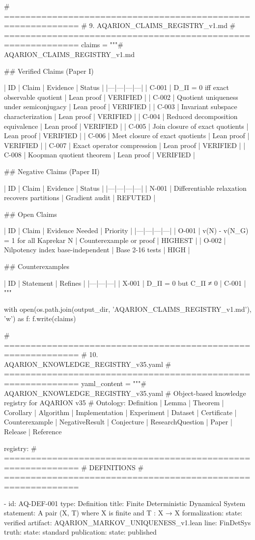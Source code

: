 # ============================================================
# 9. AQARION_CLAIMS_REGISTRY_v1.md
# ============================================================
claims = """# AQARION_CLAIMS_REGISTRY_v1.md

## Verified Claims (Paper I)

| ID | Claim | Evidence | Status |
|---|---|---|---|
| C-001 | D_Π = 0 iff exact observable quotient | Lean proof | VERIFIED |
| C-002 | Quotient uniqueness under semiconjugacy | Lean proof | VERIFIED |
| C-003 | Invariant subspace characterization | Lean proof | VERIFIED |
| C-004 | Reduced decomposition equivalence | Lean proof | VERIFIED |
| C-005 | Join closure of exact quotients | Lean proof | VERIFIED |
| C-006 | Meet closure of exact quotients | Lean proof | VERIFIED |
| C-007 | Exact operator compression | Lean proof | VERIFIED |
| C-008 | Koopman quotient theorem | Lean proof | VERIFIED |

## Negative Claims (Paper II)

| ID | Claim | Evidence | Status |
|---|---|---|---|
| N-001 | Differentiable relaxation recovers partitions | Gradient audit | REFUTED |

## Open Claims

| ID | Claim | Evidence Needed | Priority |
|---|---|---|---|
| O-001 | v(N) - v(N_G) = 1 for all Kaprekar N | Counterexample or proof | HIGHEST |
| O-002 | Nilpotency index base-independent | Base 2-16 tests | HIGH |

## Counterexamples

| ID | Statement | Refines |
|---|---|---|
| X-001 | D_Π = 0 but C_Π ≠ 0 | C-001 |
"""

with open(os.path.join(output_dir, 'AQARION_CLAIMS_REGISTRY_v1.md'), 'w') as f:
    f.write(claims)

# ============================================================
# 10. AQARION_KNOWLEDGE_REGISTRY_v35.yaml
# ============================================================
yaml_content = """# AQARION_KNOWLEDGE_REGISTRY_v35.yaml
# Object-based knowledge registry for AQARION v35
# Ontology: Definition | Lemma | Theorem | Corollary | Algorithm | Implementation | Experiment | Dataset | Certificate | Counterexample | NegativeResult | Conjecture | ResearchQuestion | Paper | Release | Reference

registry:
  # ============================================================
  # DEFINITIONS
  # ============================================================

  - id: AQ-DEF-001
    type: Definition
    title: Finite Deterministic Dynamical System
    statement: A pair (X, T) where X is finite and T : X → X
    formalization:
      state: verified
      artifact: AQARION_MARKOV_UNIQUENESS_v1.lean
      line: FinDetSys
    truth:
      state: standard
    publication:
      state: published

